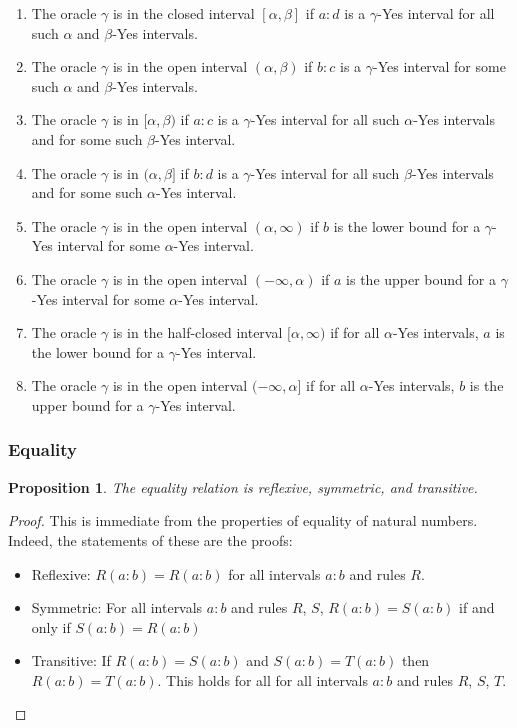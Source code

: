 \documentclass[12pt]{article}
\newtheorem{proposition}{Proposition}[subsection]
\theoremstyle{remark}
\begin{document}
\begin{enumerate}
\item The oracle $\gamma$ is in the closed interval $[\alpha, \beta]$ if $a:d$ is a $\gamma$-Yes interval for all such $\alpha$ and $\beta$-Yes intervals. 
\item The oracle $\gamma$ is in the open interval $(\alpha, \beta)$ if $b:c$ is a $\gamma$-Yes interval for some such $\alpha$ and $\beta$-Yes intervals. 
\item The oracle $\gamma$ is in $[\alpha, \beta)$ if $a:c$ is a $\gamma$-Yes interval for all such $\alpha$-Yes intervals and for some such $\beta$-Yes interval.
\item The oracle $\gamma$ is in $(\alpha, \beta]$ if $b:d$ is a $\gamma$-Yes interval for all such $\beta$-Yes intervals and for some such $\alpha$-Yes interval.
\item The oracle $\gamma$ is in the open interval $(\alpha, \infty)$ if $b$ is the lower bound for a $\gamma$-Yes interval for some $\alpha$-Yes interval. 
\item The oracle $\gamma$ is in the open interval $(-\infty, \alpha)$ if $a$ is the upper bound for a $\gamma$-Yes interval for some $\alpha$-Yes interval. 
\item The oracle $\gamma$ is in the half-closed interval $[\alpha, \infty)$ if for all $\alpha$-Yes intervals, $a$ is the lower bound for a $\gamma$-Yes interval. 
\item The oracle $\gamma$ is in the open interval $(-\infty, \alpha]$ if for all $\alpha$-Yes intervals, $b$ is the upper bound for a $\gamma$-Yes interval. 
\end{enumerate}



\subsubsection{Equality}

\begin{proposition}\label{pr:reflexive}
The equality relation is reflexive, symmetric, and transitive. 
\end{proposition}

\begin{proof}
This is immediate from the properties of equality of natural numbers. Indeed, the statements of these are the proofs:
\begin{itemize}
    \item Reflexive: $R(a:b)=R(a:b)$ for all intervals $a:b$ and rules $R$.
    \item Symmetric: For all intervals $a:b$ and rules $R$, $S$, $R(a:b)=S(a:b)$ if and only if $S(a:b) = R(a:b)$ 
    \item Transitive: If $R(a:b)=S(a:b)$ and $S(a:b) = T(a:b)$ then $R(a:b)=T(a:b)$. This holds for all for all intervals $a:b$ and rules $R$, $S$, $T$.
\end{itemize}
\end{proof}
\end{document}

